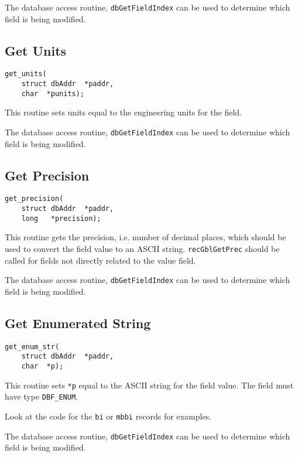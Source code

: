 The database access routine, \verb|dbGetFieldIndex| can be used to determine which field is being modified.

\subsection{Get Units}

\begin{verbatim}
get_units(
    struct dbAddr  *paddr,
    char  *punits);
\end{verbatim}

This routine sets units equal to the engineering units for the field.

The database access routine, \verb|dbGetFieldIndex| can be used to determine which field is being modified.

\subsection{Get Precision}

\begin{verbatim}
get_precision(
    struct dbAddr  *paddr,
    long   *precision);
\end{verbatim}

This routine gets the precision, i.e. number of decimal places, which should be used to convert the field value to an ASCII 
string. \verb|recGblGetPrec| should be called for fields not directly related to the value field.

The database access routine, \verb|dbGetFieldIndex| can be used to determine which field is being modified.

\subsection{Get Enumerated String}

\begin{verbatim}
get_enum_str(
    struct dbAddr  *paddr,
    char  *p);
\end{verbatim}

This routine sets \verb|*p| equal to the ASCII string for the field value. The field must have type \verb|DBF_ENUM|.

Look at the code for the \verb|bi| or \verb|mbbi| records for examples.

The database access routine, \verb|dbGetFieldIndex| can be used to determine which field is being modified.

